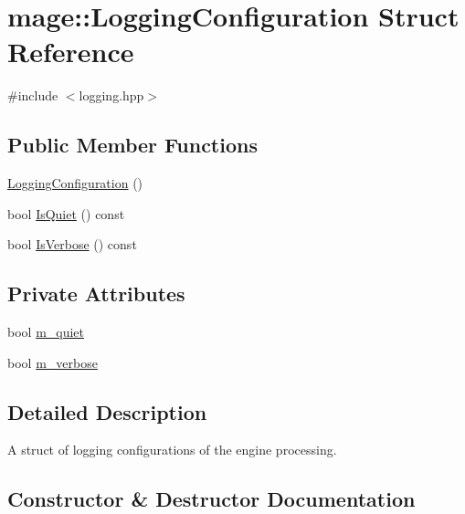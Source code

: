 \hypertarget{structmage_1_1_logging_configuration}{}\section{mage\+:\+:Logging\+Configuration Struct Reference}
\label{structmage_1_1_logging_configuration}


{\ttfamily \#include $<$logging.\+hpp$>$}

\subsection*{Public Member Functions}
\begin{DoxyCompactItemize}
\item 
\hyperlink{structmage_1_1_logging_configuration_a3d397c3ce26c1c42c9ae4a391391c6f9}{Logging\+Configuration} ()
\item 
bool \hyperlink{structmage_1_1_logging_configuration_ac081313b7a9440bcd73b6a9b69ff3452}{Is\+Quiet} () const
\item 
bool \hyperlink{structmage_1_1_logging_configuration_a13d91de33f888eee31f4d4e6b1237675}{Is\+Verbose} () const
\end{DoxyCompactItemize}
\subsection*{Private Attributes}
\begin{DoxyCompactItemize}
\item 
bool \hyperlink{structmage_1_1_logging_configuration_a38f457d5db84d15e008841ca8653b47c}{m\+\_\+quiet}
\item 
bool \hyperlink{structmage_1_1_logging_configuration_a60f052c2bb702d8153188e93f00427ac}{m\+\_\+verbose}
\end{DoxyCompactItemize}


\subsection{Detailed Description}
A struct of logging configurations of the engine processing. 

\subsection{Constructor \& Destructor Documentation}
\hypertarget{structmage_1_1_logging_configuration_a3d397c3ce26c1c42c9ae4a391391c6f9}{}\label{structmage_1_1_logging_configuration_a3d397c3ce26c1c42c9ae4a391391c6f9} 
